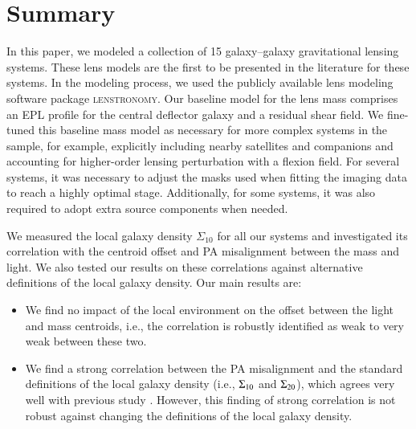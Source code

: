 \documentclass{aa}
\begin{document}
\section{Summary}
\label{sec:summary}


In this paper, we modeled a collection of 15 galaxy--galaxy gravitational lensing systems. These lens models are the first to be presented in the literature for these systems. In the modeling process, we used the publicly available lens modeling software package \textsc{lenstronomy}. Our baseline model for the lens mass comprises an EPL profile for the central deflector galaxy and a residual shear field. We fine-tuned this baseline mass model as necessary for more complex systems in the sample, for example, explicitly including nearby satellites and companions and accounting for higher-order lensing perturbation with a flexion field. For several systems, it was necessary to adjust the masks used when fitting the imaging data to reach a highly optimal stage. Additionally, for some systems, it was also required to adopt extra source components when needed. 

We measured the local galaxy density $\Sigma_{10}$ for all our systems and investigated its correlation with the centroid offset and PA misalignment between the mass and light. We also tested our results on these correlations against alternative definitions of the local galaxy density. Our main results are:

\begin{itemize}
    \item We find no impact of the local environment on the offset between the light and mass centroids, i.e., the correlation is robustly identified as weak to very weak between these two.

    \item We find a strong correlation between the PA misalignment and the standard definitions of the local galaxy density (i.e., $\Sigma_{\rm 10}$ and $\Sigma_{\rm 20}$), which agrees very well with previous study \citep{Treu09}. However, this finding of strong correlation is not robust against changing the definitions of the local galaxy density.
\end{itemize}
\end{document}

